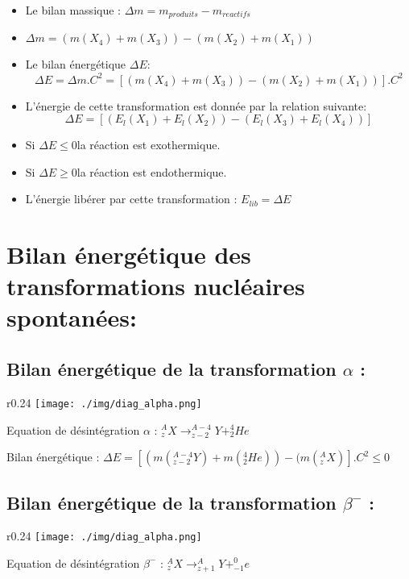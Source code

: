 \documentclass[12pt]{article}
\begin{document}
\begin{itemize}
	\item Le bilan massique : $\Delta{m} = m_{produits} - m_{reactifs}$
	\item $\Delta{m} = (m(X_4) + m(X_3))- (m(X_2) + m(X_1)) $
	\item Le bilan énergétique $\Delta{E} $: 
		$$\Delta{E} = \Delta{m}.C^2=[(m(X_4) + m(X_3))- (m(X_2) + m(X_1))].C^2$$
	\item L'énergie de cette transformation est donnée par la relation suivante:
		$$\Delta{E} = [(E_l(X_1) + E_l(X_2))- (E_l(X_3) + E_l(X_4))]$$
	\item Si $\Delta{E} \leq 0$la réaction est exothermique.
	\item Si $\Delta{E} \geq 0$la réaction est endothermique.
	\item L’énergie libérer par cette transformation : $E_{lib} = \Delta{E}$
\end{itemize}

\section{Bilan énergétique des transformations nucléaires spontanées:}
\subsection{Bilan énergétique de la transformation $\alpha$ : }
\begin{wrapfigure}[5]{r}{0.24\textwidth}
	\vspace{-1.2cm}
	\texttt{[image: ./img/diag\_alpha.png]}
\end{wrapfigure}


Equation de désintégration $\alpha$ : $_z^AX \rightarrow _{z-2}^{A-4}Y + _2^4He$

Bilan énergétique : $\Delta{E} =[(m(_{z-2}^{A-4}Y) + m(_2^4He))- (m(_z^AX) ].C^2 \leq 0 $

\subsection{Bilan énergétique de la transformation $\beta^-$ : }

\begin{wrapfigure}[5]{r}{0.24\textwidth}
	\vspace{-1.2cm}
	\texttt{[image: ./img/diag\_alpha.png]}
\end{wrapfigure}


Equation de désintégration $\beta^-$ : $_z^AX \rightarrow _{z+1}^{A}Y + _{-1}^0e$
\end{document}
